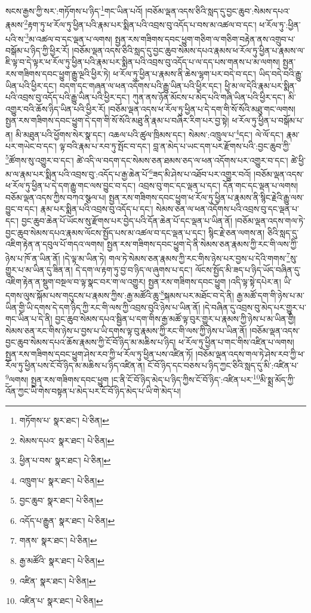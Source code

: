 སངས་རྒྱས་ཀྱི་སར་:གཏོགས་པ་ཉིད་\footnote{གཏོགས་པ་  སྣར་ཐང་།  པེ་ཅིན། }གང་ཡིན་པའོ། །བཅོམ་ལྡན་འདས་ཅིའི་སླད་དུ་བྱང་ཆུབ་:སེམས་དཔའ་རྣམས་\footnote{སེམས་དཔའ་  སྣར་ཐང་།  པེ་ཅིན། }རྟག་ཏུ་ཕ་རོལ་ཏུ་ཕྱིན་པའི་རྣམ་པར་སྨིན་པའི་འབྲས་བུ་འདོད་པ་བས་མ་འཚལ་བ་དང་། ཕ་རོལ་ཏུ་:ཕྱིན་པའི་ས་\footnote{ཕྱིན་པ་བས་  སྣར་ཐང་།  པེ་ཅིན། }མ་འཚལ་བ་དང་ལྡན་པ་ལགས། སྤྱན་རས་གཟིགས་དབང་ཕྱུག་གཅིག་ལ་གཅིག་བརྟེན་ནས་འགྲུབ་པ་བསྒོམ་པ་ཉིད་ཀྱི་ཕྱིར་རོ། །བཅོམ་ལྡན་འདས་ཅིའི་སླད་དུ་བྱང་ཆུབ་སེམས་དཔའ་རྣམས་ཕ་རོལ་ཏུ་ཕྱིན་པ་རྣམས་ལ་ཇི་ལྟ་བ་དེ་ལྟར་ཕ་རོལ་ཏུ་ཕྱིན་པའི་རྣམ་པར་སྨིན་པའི་འབྲས་བུ་འདོད་པ་ལ་དད་པས་གནས་པ་མ་ལགས། སྤྱན་རས་གཟིགས་དབང་ཕྱུག་རྒྱུ་ལྔའི་ཕྱིར་ཏེ། ཕ་རོལ་ཏུ་ཕྱིན་པ་རྣམས་ནི་ཆེས་ལྷག་པར་བདེ་བ་དང་། ཡིད་བདེ་བའི་རྒྱུ་ཡིན་པའི་ཕྱིར་དང་། བདག་དང་གཞན་ལ་ཕན་འདོགས་པའི་རྒྱུ་ཡིན་པའི་ཕྱིར་དང་། ཕྱི་མ་ལ་དེའི་རྣམ་པར་སྨིན་པའི་འབྲས་བུ་འདོད་པའི་རྒྱུ་ཡིན་པའི་ཕྱིར་དང་། ཀུན་ནས་ཉོན་མོངས་པ་མེད་པའི་གཞི་ཡིན་པའི་ཕྱིར་དང་། མི་འགྱུར་བའི་ཆོས་ཉིད་ཡིན་པའི་ཕྱིར་རོ། །བཅོམ་ལྡན་འདས་ཕ་རོལ་ཏུ་ཕྱིན་པ་དེ་དག་གི་སོ་སོའི་མཐུ་གང་ལགས། སྤྱན་རས་གཟིགས་དབང་ཕྱུག་དེ་དག་གི་སོ་སོའི་མཐུ་ནི་རྣམ་པ་བཞིར་རིག་པར་བྱ་སྟེ། ཕ་རོལ་ཏུ་ཕྱིན་པ་བསྒོམ་པ་ན། མི་མཐུན་པའི་ཕྱོགས་སེར་སྣ་དང་། འཆལ་པའི་ཚུལ་ཁྲིམས་དང་། སེམས་:འཁྲུལ་པ་\footnote{འཁྲུག་པ་  སྣར་ཐང་།  པེ་ཅིན། }དང་། ལེ་ལོ་དང་། རྣམ་པར་གཡེང་བ་དང་། ལྟ་བའི་རྣམ་པ་རབ་ཏུ་སྤོང་བ་དང་། བླ་ན་མེད་པ་ཡང་དག་པར་རྫོགས་པའི་:བྱང་ཆུབ་ཀྱི་\footnote{བྱང་ཆུབ་  སྣར་ཐང་།  པེ་ཅིན། }ཚོགས་སུ་འགྱུར་བ་དང་། ཚེ་འདི་ལ་བདག་དང་སེམས་ཅན་ཐམས་ཅད་ལ་ཕན་འདོགས་པར་འགྱུར་བ་དང་། ཚེ་ཕྱི་མ་ལ་རྣམ་པར་སྨིན་པའི་འབྲས་བུ་:འདོད་པ་རྒྱ་ཆེན་པོ་\footnote{འདོད་པ་རྒྱུན་  སྣར་ཐང་།  པེ་ཅིན། }ཟད་མི་ཤེས་པ་འཐོབ་པར་འགྱུར་བའོ། །བཅོམ་ལྡན་འདས་ཕ་རོལ་ཏུ་ཕྱིན་པ་དེ་དག་རྒྱུ་གང་ལས་བྱུང་བ་དང་། འབྲས་བུ་གང་དང་ལྡན་པ་དང་། དོན་གང་དང་ལྡན་པ་ལགས། བཅོམ་ལྡན་འདས་ཀྱིས་བཀའ་སྩལ་པ། སྤྱན་རས་གཟིགས་དབང་ཕྱུག་ཕ་རོལ་ཏུ་ཕྱིན་པ་རྣམས་ནི་སྙིང་རྗེའི་རྒྱུ་ལས་བྱུང་བ་དང་། རྣམ་པར་སྨིན་པའི་འབྲས་བུ་འདོད་པ་དང་། སེམས་ཅན་ལ་ཕན་འདོགས་པའི་འབྲས་བུ་དང་ལྡན་པ་དང་། བྱང་ཆུབ་ཆེན་པོ་ཡོངས་སུ་རྫོགས་པར་བྱེད་པའི་དོན་ཆེན་པོ་དང་ལྡན་པ་ཡིན་ནོ། །བཅོམ་ལྡན་འདས་གལ་ཏེ་བྱང་ཆུབ་སེམས་དཔའ་རྣམས་ལོངས་སྤྱོད་པས་མ་འཚལ་བ་དང་ལྡན་པ་དང་། སྙིང་རྗེ་ཅན་ལགས་ན། ཅིའི་སླད་དུ་འཇིག་རྟེན་ན་དབུལ་པོ་གདའ་ལགས། སྤྱན་རས་གཟིགས་དབང་ཕྱུག་དེ་ནི་སེམས་ཅན་རྣམས་ཀྱི་རང་གི་ལས་ཀྱི་ཉེས་པ་ཁོ་ན་ཡིན་ནོ། །དེ་ལྟ་མ་ཡིན་ཏེ། གལ་ཏེ་སེམས་ཅན་རྣམས་ཀྱི་རང་གིས་ཉེས་པར་བྱས་པ་དེའི་གགས་\footnote{གནས་  སྣར་ཐང་།  པེ་ཅིན། }སུ་གྱུར་པ་མ་ཡིན་དུ་ཟིན་ན། དེ་དག་ལ་རྟག་ཏུ་བྱ་བ་ཉིད་ལ་ཞུགས་པ་དང་། ལོངས་སྤྱོད་མི་ཟད་པ་ཉིད་ཡོད་བཞིན་དུ་འཇིག་རྟེན་ན་སྡུག་བསྔལ་བ་ལྟ་སྣང་བར་ག་ལ་འགྱུར། སྤྱན་རས་གཟིགས་དབང་ཕྱུག །འདི་ལྟ་སྟེ་དཔེར་ན། ཡི་དགས་ལུས་སྐོམ་པས་གདུངས་པ་རྣམས་ཀྱིས་:རྒྱ་མཚོའི་ཆུ་\footnote{རྒྱ་མཚོའི་  སྣར་ཐང་།  པེ་ཅིན། }སྐམས་པར་མཐོང་བ་དེ་ནི། རྒྱ་མཚོ་དག་གི་ཉེས་པ་མ་ཡིན་གྱི་ཡི་དགས་དེ་དག་ཉིད་ཀྱི་རང་གི་ལས་ཀྱི་འབྲས་བུའི་ཉེས་པ་ཡིན་ནོ། །དེ་བཞིན་དུ་འབྲས་བུ་མེད་པར་གྱུར་པ་གང་ཡིན་པ་དེ་ནི། བྱང་ཆུབ་སེམས་དཔའ་སྦྱིན་པ་དག་གིས་རྒྱ་མཚོ་ལྟ་བུར་གྱུར་པ་རྣམས་ཀྱི་ཉེས་པ་མ་ཡིན་གྱི། སེམས་ཅན་རང་གིས་ཉེས་པ་བྱས་པ་ཡི་དགས་ལྟ་བུ་རྣམས་ཀྱི་རང་གི་ལས་ཀྱི་ཉེས་པ་ཡིན་ནོ། །བཅོམ་ལྡན་འདས་བྱང་ཆུབ་སེམས་དཔའ་ཆོས་རྣམས་ཀྱི་ངོ་བོ་ཉིད་མ་མཆིས་པ་ཉིད། ཕ་རོལ་ཏུ་ཕྱིན་པ་གང་གིས་འཛིན་པ་ལགས། སྤྱན་རས་གཟིགས་དབང་ཕྱུག་ཤེས་རབ་ཀྱི་ཕ་རོལ་ཏུ་ཕྱིན་པས་འཛིན་ཏོ། །བཅོམ་ལྡན་འདས་གལ་ཏེ་ཤེས་རབ་ཀྱི་ཕ་རོལ་ཏུ་ཕྱིན་པས་ངོ་བོ་ཉིད་མ་མཆིས་པ་ཉིད་འཛིན་ན། ངོ་བོ་ཉིད་དང་བཅས་པ་ཉིད་ཀྱང་ཅིའི་སླད་དུ་མི་:འཛིན་པ་\footnote{འཛིན་  སྣར་ཐང་།  པེ་ཅིན། }ལགས། སྤྱན་རས་གཟིགས་དབང་ཕྱུག །ང་ནི་ངོ་བོ་ཉིད་མེད་པ་ཉིད་ཀྱིས་ངོ་བོ་ཉིད་:འཛིན་པར་\footnote{འཛིན་པ་  སྣར་ཐང་།  པེ་ཅིན། }མི་སྨྲ་མོད་ཀྱི་འོན་ཀྱང་ཡི་གེས་བསྟན་པ་མེད་པར་ངོ་བོ་ཉིད་མེད་པ་ཡི་གེ་མེད་པ། 
